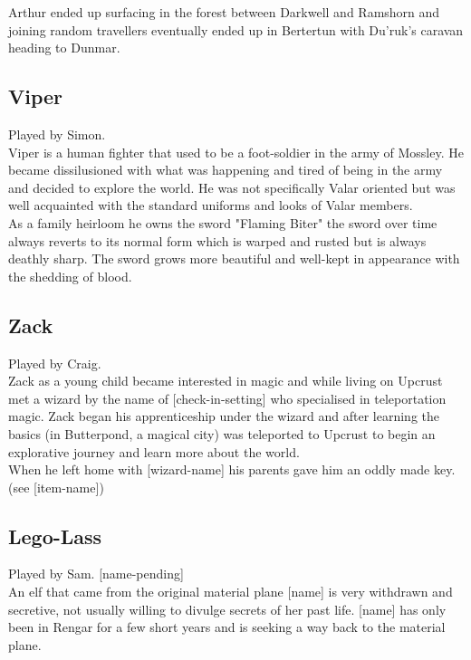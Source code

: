 \documentclass[10pt,twoside,twocolumn]{article}
\begin{document}
Arthur ended up surfacing in the forest between Darkwell and Ramshorn and joining random travellers eventually ended up in Bertertun with Du'ruk's caravan heading to Dunmar. \\

\subsection{Viper}
Played by Simon. \\

Viper is a human fighter that used to be a foot-soldier in the army of Mossley. He became dissilusioned with what was happening and tired of being in the army and decided to explore the world. He was not specifically Valar oriented but was well acquainted with the standard uniforms and looks of Valar members. \\

As a family heirloom he owns the sword "Flaming Biter" the sword over time always reverts to its normal form which is warped and rusted but is always deathly sharp. The sword grows more beautiful and well-kept in appearance with the shedding of blood. \\

\subsection{Zack}
Played by Craig. \\

Zack as a young child became interested in magic and while living on Upcrust met a wizard by the name of [check-in-setting] who specialised in teleportation magic. Zack began his apprenticeship under the wizard and after learning the basics (in Butterpond, a magical city) was teleported to Upcrust to begin an explorative journey and learn more about the world.\\

When he left home with [wizard-name] his parents gave him an oddly made key. (see [item-name]) \\

\subsection{Lego-Lass}
Played by Sam. [name-pending] \\

An elf that came from the original material plane [name] is very withdrawn and secretive, not usually willing to divulge secrets of her past life. [name] has only been in Rengar for a few short years and is seeking a way back to the material plane. \\
\end{document}
